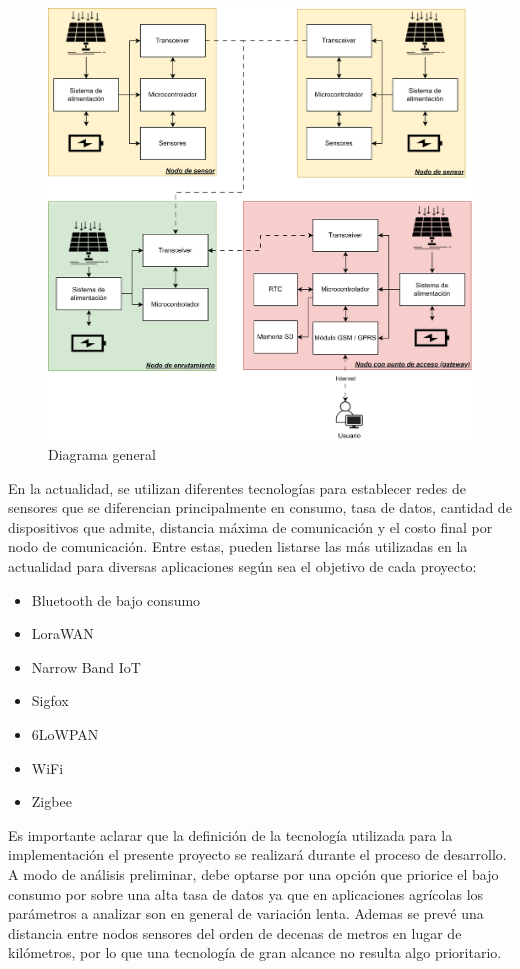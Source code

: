 \documentclass[
11pt, %
codirector, %
]{charter}
\begin{document}
\begin{figure}[htpb]
\centering 
\includegraphics[width=.6\textwidth]{./Figuras/DiagramaGeneral.png}
\caption{Diagrama general}
\label{fig:DiagramaGeneral}
\end{figure}


En la actualidad, se utilizan diferentes tecnologías para establecer redes de sensores que se diferencian principalmente en consumo, tasa de datos, cantidad de dispositivos que admite, distancia máxima de comunicación y el costo final por nodo de comunicación. Entre estas, pueden listarse las más utilizadas en la actualidad para diversas aplicaciones según sea el objetivo de cada proyecto:

\begin{itemize}
\item Bluetooth de bajo consumo
\item LoraWAN
\item Narrow Band IoT
\item Sigfox
\item 6LoWPAN
\item WiFi
\item Zigbee
\end{itemize}

Es importante aclarar que la definición de la tecnología utilizada para la implementación el presente proyecto se realizará durante el proceso de desarrollo. A modo de análisis preliminar, debe optarse por una opción que priorice el bajo consumo por sobre una alta tasa de datos ya que en aplicaciones agrícolas los parámetros a analizar son en general de variación lenta. Ademas se prevé una distancia entre nodos sensores del orden de decenas de metros en lugar de kilómetros, por lo que una tecnología de gran alcance no resulta algo prioritario.
\end{document}
